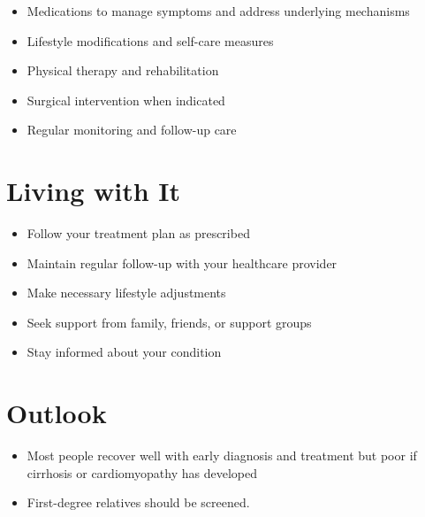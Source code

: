 \begin{itemize}[noitemsep]
  \item Medications to manage symptoms and address underlying mechanisms
  \item Lifestyle modifications and self-care measures
  \item Physical therapy and rehabilitation
  \item Surgical intervention when indicated
  \item Regular monitoring and follow-up care
\end{itemize}
\section{Living with It}
\begin{itemize}[noitemsep]
  \item Follow your treatment plan as prescribed
  \item Maintain regular follow-up with your healthcare provider
  \item Make necessary lifestyle adjustments
  \item Seek support from family, friends, or support groups
  \item Stay informed about your condition
\end{itemize}
\section{Outlook}
\begin{itemize}[noitemsep]
  \item Most people recover well with early diagnosis and treatment but poor if cirrhosis or cardiomyopathy has developed
  \item First-degree relatives should be screened.
\end{itemize}
